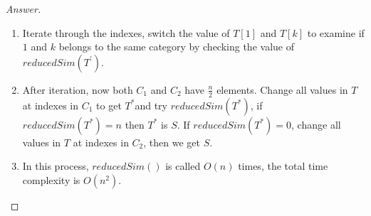 \documentclass{article}
\theoremstyle{plain}
\newenvironment{answer}[1][Answer]
    {\begin{proof}[#1]{$ $}\renewcommand\qedsymbol{$\vartriangle$}}
    {\end{proof}}
\begin{document}
\begin{answer}
\begin{enumerate}
\begin{enumerate}
            \item
            Iterate through the indexes, switch the value of $T[1]$ and $T[k]$ to examine if $1$ and $k$ belongs to the same category by checking the value of $reducedSim(T^\prime)$.
            \item
            After iteration, now both $C_1$ and $C_2$ have $\displaystyle \frac{n}{2}$ elements. Change all values in $T$ at indexes in $C_1$ to get $T^*$and try $reducedSim(T^*)$, if $reducedSim(T^*) = n$ then $T^*$ is $S$. If $reducedSim(T^*) = 0$, change all values in $T$ at indexes in $C_2$, then we get $S$.
            \item
            In this process, $reducedSim()$ is called $O(n)$ times, the total time complexity is $O(n^2)$.
        \end{enumerate}
    \end{enumerate}
\end{answer}
\end{document}
